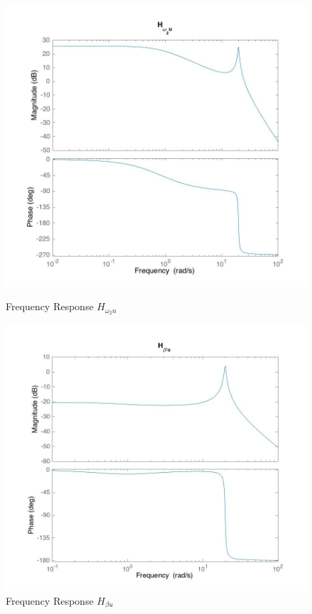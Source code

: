 \documentclass[11pt,titlepage]{article}
\begin{document}
       \begin{figure}[H]
            \centering
            \begin{minipage}{.5\textwidth}
                \centering
              	\includegraphics[trim={2cm 0 0 0},clip,origin=c,scale=0.25]{w2_bode}
            	\caption{Frequency Response $H_{\omega_{2}u}$}
           	\label{fig:disc_sys}
            \end{minipage}%
            \begin{minipage}{.5\textwidth}
                \centering
                \includegraphics[trim={2cm 0 0 0},clip,origin=c,scale=0.25]{B_bode}
            \caption{Frequency Response $H_{\beta u}$}
            \label{fig:disc_sys}
            \end{minipage}%
       \end{figure}
\end{document}
